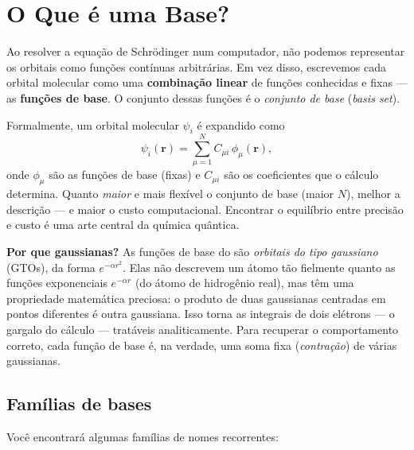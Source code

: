 \section{O Que é uma Base?}
\label{sec:base}

Ao resolver a equação de Schrödinger num computador, não podemos representar os
orbitais como funções contínuas arbitrárias. Em vez disso, escrevemos cada
orbital molecular como uma \textbf{combinação linear} de funções conhecidas e
fixas --- as \textbf{funções de base}. O conjunto dessas funções é o
\emph{conjunto de base} (\emph{basis set}).

Formalmente, um orbital molecular $\psi_i$ é expandido como
\[
  \psi_i(\mathbf{r}) = \sum_{\mu=1}^{N} C_{\mu i}\,\phi_\mu(\mathbf{r}),
\]
onde $\phi_\mu$ são as funções de base (fixas) e $C_{\mu i}$ são os coeficientes
que o cálculo determina. Quanto \emph{maior} e mais flexível o conjunto de base
(maior $N$), melhor a descrição --- e maior o custo computacional. Encontrar o
equilíbrio entre precisão e custo é uma arte central da química quântica.

\begin{caixanota}
\textbf{Por que gaussianas?} As funções de base do \pyscf{} são \emph{orbitais do
tipo gaussiano} (GTOs), da forma $e^{-\alpha r^2}$. Elas não descrevem um átomo
tão fielmente quanto as funções exponenciais $e^{-\alpha r}$ (do átomo de
hidrogênio real), mas têm uma propriedade matemática preciosa: o produto de duas
gaussianas centradas em pontos diferentes é outra gaussiana. Isso torna as
integrais de dois elétrons --- o gargalo do cálculo --- tratáveis analiticamente.
Para recuperar o comportamento correto, cada função de base é, na verdade, uma
soma fixa (\emph{contração}) de várias gaussianas.
\end{caixanota}

\subsection{Famílias de bases}

Você encontrará algumas famílias de nomes recorrentes:

